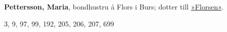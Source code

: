 \textbf{Pettersson, Maria}, bondhustru å Flors i Burs; dotter till \href{Florsen}{»Florsen»}. 

3, 9, 97, 99, 192, 205, 206, 207, 699 

